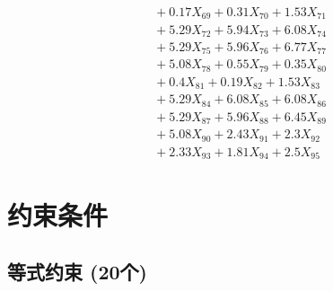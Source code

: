 \documentclass[a4paper,10pt]{article}
\begin{document}
{\begin{align}
&\;  + 0.17 X_{69} + 0.31 X_{70} + 1.53 X_{71} \\[0.3ex]
&\;  + 5.29 X_{72} + 5.94 X_{73} + 6.08 X_{74} \\[0.3ex]
&\;  + 5.29 X_{75} + 5.96 X_{76} + 6.77 X_{77} \\[0.3ex]
&\;  + 5.08 X_{78} + 0.55 X_{79} + 0.35 X_{80} \\[0.3ex]
&\;  + 0.4 X_{81} + 0.19 X_{82} + 1.53 X_{83} \\[0.5ex]\allowbreak
&\;  + 5.29 X_{84} + 6.08 X_{85} + 6.08 X_{86} \\[0.3ex]
&\;  + 5.29 X_{87} + 5.96 X_{88} + 6.45 X_{89} \\[0.3ex]
&\;  + 5.08 X_{90} + 2.43 X_{91} + 2.3 X_{92} \\[0.3ex]
&\;  + 2.33 X_{93} + 1.81 X_{94} + 2.5 X_{95}\nonumber
\end{align}
}

\section{约束条件}

\subsection{等式约束 (20个)}
\end{document}
